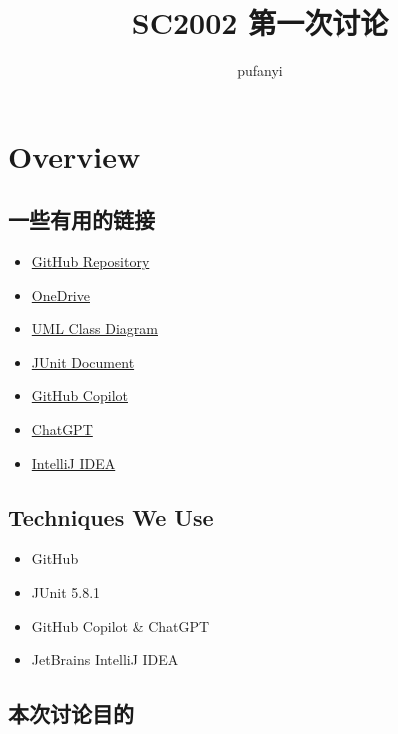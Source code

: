 \documentclass[hyperref,UTF8,12pt,a4paper]{ctexart}
\title{SC2002 第一次讨论}
\author{pufanyi}
\date{}
\begin{document}
\maketitle

\newpage

\tableofcontents

\newpage

\section{Overview}

\subsection{一些有用的链接}

\begin{itemize}
	\item \href{https://github.com/pufanyi/FYPMS}{GitHub Repository}
	\item \href{https://entuedu-my.sharepoint.com/:f:/g/personal/fpu001_e_ntu_edu_sg/Embuz9y7knpDkyns5CtpZbYB3_DFHYlSW8juG4VNlmebQw?e=0epo7C}{OneDrive}
	\item \href{https://app.diagrams.net/#G1WnqguonN8IsbEKNIC2t_wnUjkQRhu4ny}{UML Class Diagram}
	\item \href{https://junit.org/junit5/docs/current/user-guide/}{JUnit Document}
	\item \href{https://copilot.github.com/}{GitHub Copilot}
	\item \href{https://chat.openai.com/}{ChatGPT}
	\item \href{https://www.jetbrains.com/idea/}{IntelliJ IDEA}
\end{itemize}

\subsection{Techniques We Use}

\begin{itemize}
	\item GitHub
	\item JUnit 5.8.1
	\item GitHub Copilot \& ChatGPT
	\item JetBrains IntelliJ IDEA
\end{itemize}

\subsection{本次讨论目的}
\end{document}

